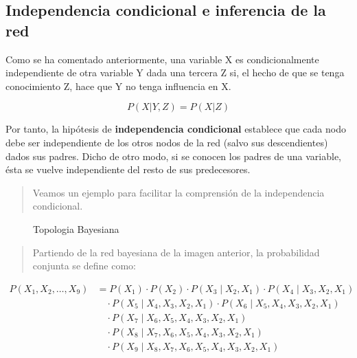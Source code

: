 \documentclass[
  a4paper,
  DIV=11,
  numbers=noendperiod]{scrreprt}
\begin{document}
\subsection{Independencia condicional e inferencia de la
red}\label{independencia-condicional-e-inferencia-de-la-red}

Como se ha comentado anteriormente, una variable X es condicionalmente
independiente de otra variable Y dada una tercera Z si, el hecho de que
se tenga conocimiento Z, hace que Y no tenga influencia en X.

\[P(X|Y,Z)=P(X|Z)\]

Por tanto, la hipótesis de \textbf{independencia condicional} establece
que cada nodo debe ser independiente de los otros nodos de la red (salvo
sus descendientes) dados sus padres. Dicho de otro modo, si se conocen
los padres de una variable, ésta se vuelve independiente del resto de
sus predecesores.

\begin{quote}
Veamos un ejemplo para facilitar la comprensión de la independencia
condicional.
\end{quote}

\begin{figure}


\caption{\label{fig-ejemplo_redes_bayesianas}Topologia Bayesiana}

\end{figure}%

\begin{quote}
Partiendo de la red bayesiana de la imagen anterior, la probabilidad
conjunta se define como:
\end{quote}

\begin{align}
P(X_1, X_2, \ldots, X_9) &= P(X_1) \cdot P(X_2) \cdot P(X_3 \mid X_2, X_1) \cdot P(X_4 \mid X_3, X_2, X_1) \\
&\quad \cdot P(X_5 \mid X_4, X_3, X_2, X_1) \cdot P(X_6 \mid X_5, X_4, X_3, X_2, X_1) \\
&\quad \cdot P(X_7 \mid X_6, X_5, X_4, X_3, X_2, X_1) \\
&\quad \cdot P(X_8 \mid X_7, X_6, X_5, X_4, X_3, X_2, X_1) \\
&\quad \cdot P(X_9 \mid X_8, X_7, X_6, X_5, X_4, X_3, X_2, X_1)
\end{align}
\end{document}
